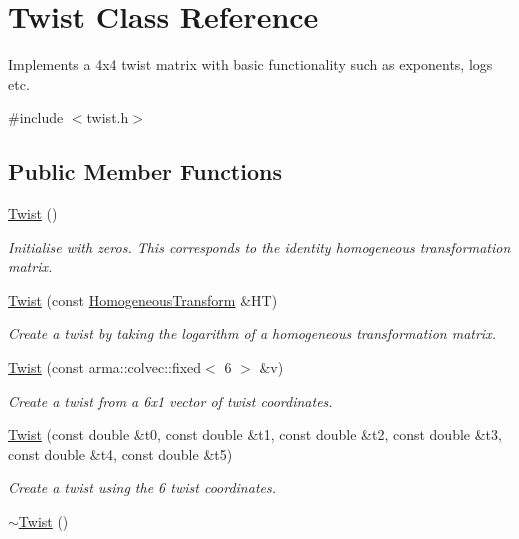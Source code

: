 \hypertarget{class_twist}{\section{Twist Class Reference}
\label{class_twist}
}


Implements a 4x4 twist matrix with basic functionality such as exponents, logs etc.  




{\ttfamily \#include $<$twist.\+h$>$}

\subsection*{Public Member Functions}
\begin{DoxyCompactItemize}
\item 
\hypertarget{class_twist_adc605211a599bca90759dcee634d3cdc}{\hyperlink{class_twist_adc605211a599bca90759dcee634d3cdc}{Twist} ()}\label{class_twist_adc605211a599bca90759dcee634d3cdc}

\begin{DoxyCompactList}\small\item\em Initialise with zeros. This corresponds to the identity homogeneous transformation matrix. \end{DoxyCompactList}\item 
\hyperlink{class_twist_a42776d552cc3751c1eec0ae1e26f1a58}{Twist} (const \hyperlink{class_homogeneous_transform}{Homogeneous\+Transform} \&H\+T)
\begin{DoxyCompactList}\small\item\em Create a twist by taking the logarithm of a homogeneous transformation matrix. \end{DoxyCompactList}\item 
\hyperlink{class_twist_a4d34345c28881dfacd18178fb114c6b2}{Twist} (const arma\+::colvec\+::fixed$<$ 6 $>$ \&v)
\begin{DoxyCompactList}\small\item\em Create a twist from a 6x1 vector of twist coordinates. \end{DoxyCompactList}\item 
\hyperlink{class_twist_a65bba405b8213de85a94b6c499d35a64}{Twist} (const double \&t0, const double \&t1, const double \&t2, const double \&t3, const double \&t4, const double \&t5)
\begin{DoxyCompactList}\small\item\em Create a twist using the 6 twist coordinates. \end{DoxyCompactList}\item 
\hypertarget{class_twist_a573ae1fbc4965e655e88f015c85905c4}{\hyperlink{class_twist_a573ae1fbc4965e655e88f015c85905c4}{$\sim$\+Twist} ()}\label{class_twist_a573ae1fbc4965e655e88f015c85905c4}


\end{DoxyCompactItemize}
